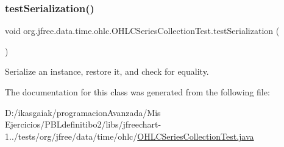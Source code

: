 \subsubsection{\texorpdfstring{test\+Serialization()}{testSerialization()}}
{\footnotesize\ttfamily void org.\+jfree.\+data.\+time.\+ohlc.\+O\+H\+L\+C\+Series\+Collection\+Test.\+test\+Serialization (\begin{DoxyParamCaption}{ }\end{DoxyParamCaption})}

Serialize an instance, restore it, and check for equality. 

The documentation for this class was generated from the following file\+:\begin{DoxyCompactItemize}
\item 
D\+:/ikasgaiak/programacion\+Avanzada/\+Mis Ejercicios/\+P\+B\+Ldefinitibo2/libs/jfreechart-\/1../tests/org/jfree/data/time/ohlc/\mbox{\hyperlink{_o_h_l_c_series_collection_test_8java}{O\+H\+L\+C\+Series\+Collection\+Test.\+java}}\end{DoxyCompactItemize}
